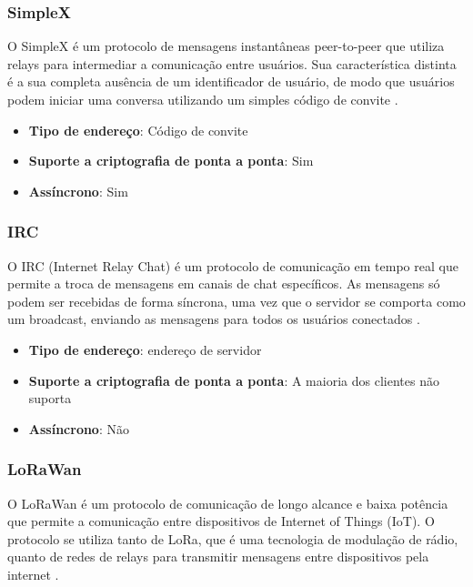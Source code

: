 \subsubsection{SimpleX}

O SimpleX é um protocolo de mensagens instantâneas peer-to-peer que utiliza relays para intermediar a comunicação entre usuários. Sua característica distinta é a sua completa ausência de um identificador de usuário, de modo que usuários podem iniciar uma conversa utilizando um simples código de convite \cite{simplex}.

\begin{itemize}
  \item \textbf{Tipo de endereço}: Código de convite
  \item \textbf{Suporte a criptografia de ponta a ponta}: Sim
  \item \textbf{Assíncrono}: Sim
\end{itemize}

\subsubsection{IRC}

O IRC (Internet Relay Chat) é um protocolo de comunicação em tempo real que permite a troca de mensagens em canais de chat específicos. As mensagens só podem ser recebidas de forma síncrona, uma vez que o servidor se comporta como um broadcast, enviando as mensagens para todos os usuários conectados \cite{rfc2810}.

\begin{itemize}
  \item \textbf{Tipo de endereço}: endereço de servidor
  \item \textbf{Suporte a criptografia de ponta a ponta}: A maioria dos clientes não suporta
  \item \textbf{Assíncrono}: Não
\end{itemize}

\subsubsection{LoRaWan}

O LoRaWan é um protocolo de comunicação de longo alcance e baixa potência que permite a comunicação entre dispositivos de Internet of Things (IoT). O protocolo se utiliza tanto de LoRa, que é uma tecnologia de modulação de rádio, quanto de redes de relays para transmitir mensagens entre dispositivos pela internet \cite{lorawan}.


